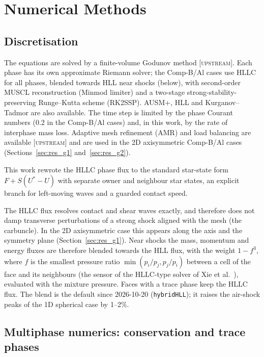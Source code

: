 \documentclass{article}
\newcommand{\up}{\textsc{[upstream]}}
\begin{document}
\section{Numerical Methods}
\label{sec:numerics}

\subsection{Discretisation}
\label{sec:discretisation}

The equations are solved by a finite-volume Godunov method \up. Each phase has its own approximate Riemann solver; the Comp-B/Al cases use HLLC \cite{toro} for all phases, blended towards HLL near shocks (below), with second-order MUSCL reconstruction (Minmod limiter) and a two-stage strong-stability-preserving Runge--Kutta scheme (RK2SSP). AUSM+, HLL and Kurganov--Tadmor are also available. The time step is limited by the phase Courant numbers (0.2 in the Comp-B/Al cases) and, in this work, by the rate of interphase mass loss. Adaptive mesh refinement (AMR) and load balancing are available \up{} and are used in the 2D axisymmetric Comp-B/Al cases (Sections~\ref{sec:res_g1} and~\ref{sec:res_g2}).

This work rewrote the HLLC phase flux to the standard star-state form $F + S(U^* - U)$ with separate owner and neighbour star states, an explicit branch for left-moving waves and a guarded contact speed.

The HLLC flux resolves contact and shear waves exactly, and therefore does not damp transverse perturbations of a strong shock aligned with the mesh (the carbuncle). In the 2D axisymmetric case this appears along the axis and the symmetry plane (Section~\ref{sec:res_g1}). Near shocks the mass, momentum and energy fluxes are therefore blended towards the HLL flux, with the weight $1 - f^3$, where $f$ is the smallest pressure ratio $\min(p_i/p_j, p_j/p_i)$ between a cell of the face and its neighbours (the sensor of the HLLC-type solver of Xie et al.\ \cite{xie2018}), evaluated with the mixture pressure. Faces with a trace phase keep the HLLC flux. The blend is the default since 2026-10-20 (\texttt{hybridHLL}); it raises the air-shock peaks of the 1D spherical case by 1--2\%.

\subsection{Multiphase numerics: conservation and trace phases}
\label{sec:multiphase_numerics}
\end{document}
